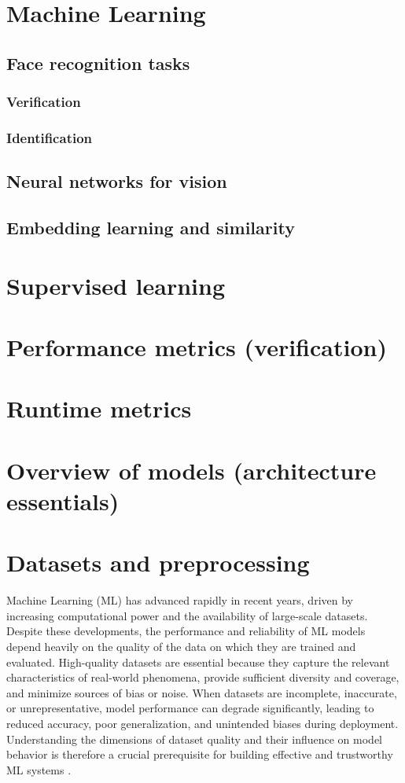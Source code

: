 \section{Machine Learning}





\subsection {Face recognition tasks}
\subsubsection {Verification}
\subsubsection {Identification}
\subsection {Neural networks for vision}
\subsection {Embedding learning and similarity}
\section{Supervised learning}
\section{Performance metrics (verification)}
\section{Runtime metrics}
\section{Overview of models (architecture essentials)}
\section{Datasets and preprocessing}
Machine Learning (ML) has advanced rapidly in recent years, driven by increasing computational power and the availability of large-scale datasets. Despite these developments, the performance and reliability of ML models depend heavily on the quality of the data on which they are trained and evaluated. High-quality datasets are essential because they capture the relevant characteristics of real-world phenomena, provide sufficient diversity and coverage, and minimize sources of bias or noise. When datasets are incomplete, inaccurate, or unrepresentative, model performance can degrade significantly, leading to reduced accuracy, poor generalization, and unintended biases during deployment.
Understanding the dimensions of dataset quality and their influence on model behavior is therefore a crucial prerequisite for building effective and trustworthy ML systems \cite{gong2023dataquality}.